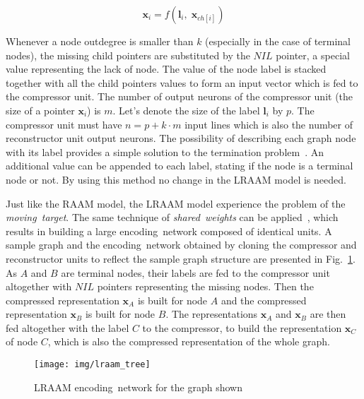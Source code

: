 \begin{equation}
\bm{x}_i = f(\bm{l}_i, \; \bm{x}_{ch[i]})
\label{eq:lraam_pointer}
\end{equation}

Whenever a node outdegree is smaller than $k$ (especially in the case of terminal nodes), the missing child pointers are substituted by the $NIL$ pointer, a special value representing the lack of node. The value of the node label is stacked together with all the child pointers values to form an input vector which is fed to the compressor unit. The number of output neurons of the compressor unit (the size of a pointer $\bm{x}_i$) is $m$. Let's denote the size of the label $\bm{l}_i$ by $p$. The compressor unit must have $n = p + k \cdot m$ input lines which is also the number of reconstructor unit output neurons. The possibility of describing each graph node with its label provides a simple solution to the termination problem~\cite{sperduti1994labelling}. An additional value can be appended to each label, stating if the node is a terminal node or not. By using this method no change in the LRAAM model is needed.

Just like the RAAM model, the LRAAM model experience the problem of the \emph{moving~target}. The same technique of \emph{shared~weights} can be applied~\cite{goulon2005hopfield}, which results in building a large encoding~network composed of identical units. A sample graph and the encoding~network obtained by cloning the compressor and reconstructor units to reflect the sample graph structure are presented in Fig.~\ref{fig:lraam_tree}. As $A$ and $B$ are terminal nodes, their labels are fed to the compressor unit altogether with $NIL$ pointers representing the missing nodes. Then the compressed representation $\bm{x}_{A}$ is built for node $A$ and the compressed representation $\bm{x}_{B}$ is built for node $B$. The representations $\bm{x}_A$ and $\bm{x}_B$ are then fed altogether with the label $C$ to the compressor, to build the representation $\bm{x}_C$ of node $C$, which is also the compressed representation of the whole graph.

\begin{figure}
\begin{center}
	\texttt{[image: img/lraam\_tree]}
	\caption{LRAAM encoding~network for the graph shown}
	\label{fig:lraam_tree}
\end{center}
\end{figure}

